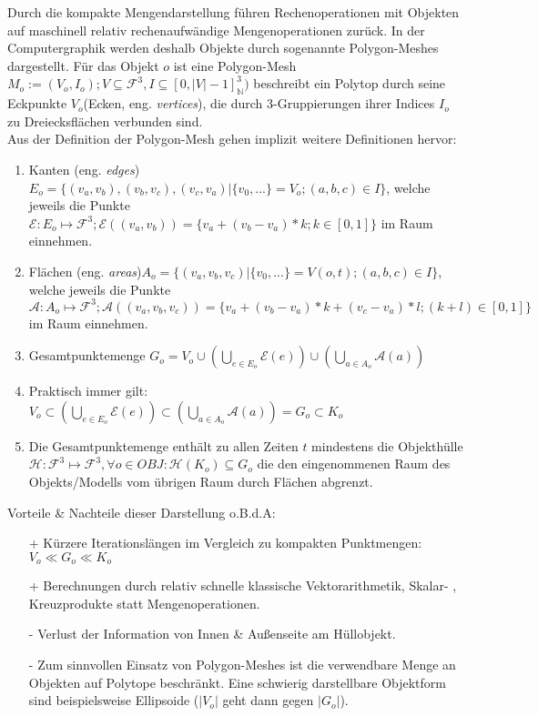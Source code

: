 Durch die kompakte Mengendarstellung führen Rechenoperationen mit Objekten auf maschinell relativ rechenaufwändige Mengenoperationen zurück. In der Computergraphik werden deshalb Objekte durch sogenannte Polygon-Meshes dargestellt. 
Für das Objekt $o$ ist eine Polygon-Mesh $M_o := (V_o, I_o); V \subseteq \mathcal{F}^3, I \subseteq [0, |V|-1]_\mathbb{N}^3 )$ beschreibt ein Polytop durch seine Eckpunkte $V_o$(Ecken, eng. \textit{vertices}), die durch 3-Gruppierungen ihrer Indices $I_o$ zu Dreiecksflächen verbunden sind.\\
Aus der Definition der Polygon-Mesh gehen implizit weitere Definitionen hervor:

\begin{enumerate}
\item Kanten (eng. \textit{edges}) $E_o = \{(v_a, v_b), (v_b, v_c),(v_c, v_a) | \{v_0, ...\} = V_o;(a, b, c) \in I\} $, welche jeweils die Punkte $\mathcal{E}:E_o\mapsto\mathcal{F}^3; \mathcal{E}((v_a, v_b)) = \{v_a + (v_b-v_a)* k; k \in [0,1]\} $ im Raum einnehmen.
\item Flächen (eng. \textit{areas})$ A_o = \{(v_a, v_b, v_c) | \{v_0, ... \} = V(o, t); (a, b, c) \in I\} $,\\
welche jeweils die Punkte $\mathcal{A}:A_o\mapsto\mathcal{F}^3; \mathcal{A}((v_a, v_b, v_c)) = \{v_a + (v_b-v_a)* k + (v_c-v_a)*l; (k+l) \in [0,1]\} $ im Raum einnehmen.
\item Gesamtpunktemenge $G_o = V_o \cup (\bigcup_{e\in E_o} \mathcal{E}(e)) \cup (\bigcup_{a\in A_o} \mathcal{A}(a)) $
\item Praktisch immer gilt: $V_o \subset (\bigcup_{e\in E_o} \mathcal{E}(e)) \subset (\bigcup_{a\in A_o} \mathcal{A}(a)) = G_o \subset K_o$
\item Die Gesamtpunktemenge enthält zu allen Zeiten $t$ mindestens die Objekthülle $\mathcal{H}: \mathcal{F}^3 \mapsto \mathcal{F}^3, \forall o\in OBJ: \mathcal{H}(K_o) \subseteq G_o$ die den eingenommenen Raum des Objekts/Modells vom übrigen Raum durch Flächen abgrenzt.
\end{enumerate}

Vorteile \& Nachteile dieser Darstellung o.B.d.A:
\begin{itemize}
\item [+]Kürzere Iterationslängen im Vergleich zu kompakten Punktmengen: $V_o \ll G_o \ll K_o$
\item [+]Berechnungen durch relativ schnelle klassische Vektorarithmetik, Skalar- , Kreuzprodukte statt Mengenoperationen.
\item [-]Verlust der Information von Innen \& Außenseite am Hüllobjekt.
\item [-]Zum sinnvollen Einsatz von Polygon-Meshes ist die verwendbare Menge an Objekten auf Polytope beschränkt. Eine schwierig darstellbare Objektform sind beispielsweise Ellipsoide ($|V_o|$ geht dann gegen $|G_o|$).
\end{itemize}

